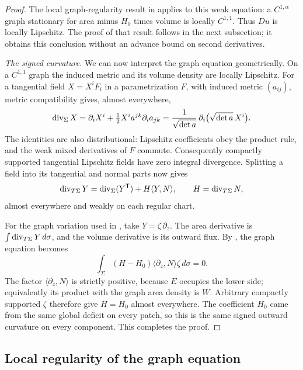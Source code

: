 \begin{proof}
The local graph-regularity result in 
applies to this weak equation: a $C^{1,\alpha}$ graph stationary for
area minus $H_0$ times volume is locally $C^{1,1}$. Thus $Du$ is
locally Lipschitz. The proof of that result follows in the next
subsection; it obtains this conclusion without an advance bound on
second derivatives.

\emph{The signed curvature.}
We can now interpret the graph equation geometrically. On a
$C^{1,1}$ graph the induced metric and its volume density are locally Lipschitz.
For a tangential field $X=X^iF_i$ in a parametrization $F$, with
induced metric $(a_{ij})$, metric compatibility gives, almost
everywhere,
\[
 \operatorname{div}_\Sigma X
 =\partial_iX^i+\tfrac12X^i a^{jk}\partial_i a_{jk}
 =\frac{1}{\sqrt{\det a}}\,
   \partial_i\bigl(\sqrt{\det a}\,X^i\bigr).
\]
The identities are also distributional: Lipschitz coefficients obey
the product rule, and the weak mixed derivatives of $F$ commute.
Consequently compactly supported tangential Lipschitz fields have
zero integral divergence. Splitting a field into its tangential
and normal parts now gives
\begin{equation}
\label{eq:equality-tangential-divergence}
 \operatorname{div}_{T\Sigma}Y
 =\operatorname{div}_\Sigma(Y^{\mathsf T})+H\langle Y,N\rangle,
 \qquad H=\operatorname{div}_{T\Sigma}N,
\end{equation}
almost everywhere and weakly on each regular chart.

For the graph variation used in
, take $Y=\zeta\,\partial_z$.
The area derivative is $\int\operatorname{div}_{T\Sigma}Y\,d\sigma$, and the
volume derivative is its outward flux. By
, the graph equation becomes
\[
 \int_\Sigma (H-H_0)\langle\partial_z,N\rangle
                       \zeta\,d\sigma=0.
\]
The factor $\langle\partial_z,N\rangle$ is strictly positive,
because $E$ occupies the lower side; equivalently its product with
the graph area density is $W$. Arbitrary compactly supported
$\zeta$ therefore give $H=H_0$ almost everywhere. The coefficient
$H_0$ came from the same global deficit on every patch, so this is
the same signed outward curvature on every component. This
completes the proof.
\end{proof}

\subsection{Local regularity of the graph equation}

